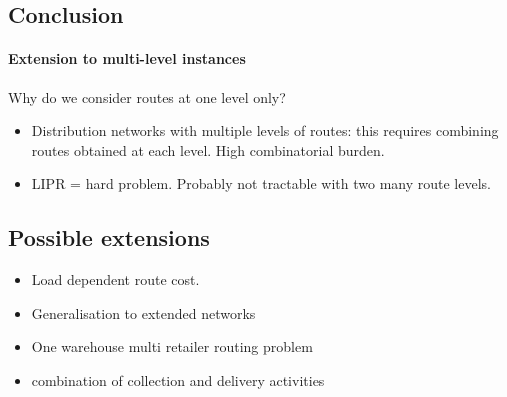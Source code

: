 \documentclass[a4paper,10pt]{article}
\begin{document}
\begin{linenumbers}
\section{Conclusion}

\paragraph{Extension to multi-level instances}

Why do we consider routes at one level only? 

\begin{itemize}
	\item Distribution networks with multiple levels of routes: this requires combining routes obtained at each level. High combinatorial burden. 
	\item LIPR = hard problem. Probably not tractable with two many route levels. 
\end{itemize}





\subsection*{Possible extensions}
\begin{itemize}
	\item Load dependent route cost. 
	\item Generalisation to extended networks
	\item One warehouse multi retailer routing problem
	\item combination of collection and delivery activities
	
\end{itemize}


\end{linenumbers}

\newpage
%


\end{document}
